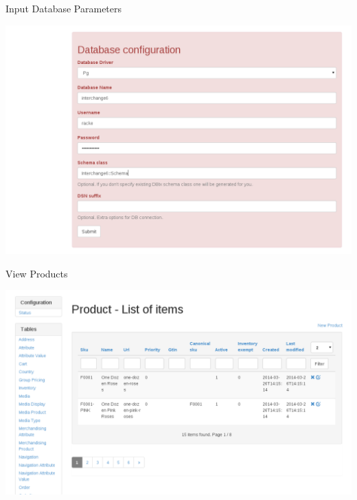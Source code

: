 \begin{frame}[plain]{Input Database Parameters}
  \begin{center}
    \includegraphics[width=\textwidth,height=1\textheight,keepaspectratio]{images/input.png}
  \end{center}
\end{frame}

\begin{frame}[plain]{View Products}
  \begin{center}
    \includegraphics[width=\textwidth,height=1\textheight,keepaspectratio]{images/product.png}
  \end{center}
\end{frame}

